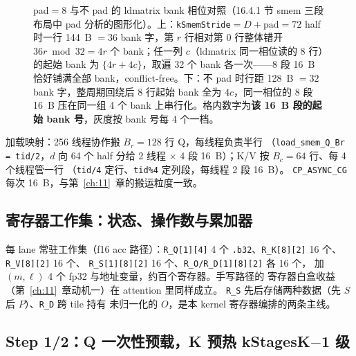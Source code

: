 \begin{figure}[H]
\caption{pad$=$8 与不 pad 的 ldmatrix bank 相位对照（16.4.1 节 smem 三段布局中 pad 分析的图形化）。上：\texttt{kSmemStride}$=D{+}\mathrm{pad}=72$ half 时一行 144~B $=36$ bank 字，第 $r$ 行相对第 0 行整体错开 $36r \bmod 32 = 4r$ 个 bank；任一列 $c$（ldmatrix 同一相位读的 8 行）的起始 bank 为 $\{4r{+}4c\}$，取遍 32 个 bank 各一次——8 段 16~B 恰好铺满全部 bank，conflict-free。下：不 pad 时行距 128~B $=32$ bank 字，整周期回绕后 8 行起始 bank 全为 $4c$，同一相位的 8 段 16~B 压在同一组 4 个 bank 上串行化。格内数字为\textbf{该 16~B 段的起始 bank 号}，灰度按 bank 号每 4 个一档。}
\label{fig:16-bank-phase}
\end{figure}

加载映射：256 线程协作搬 $B_r{=}128$ 行 Q，每线程负责半行
（\texttt{load\_\allowbreak{}smem\_\allowbreak{}Q\_\allowbreak{}Br =\allowbreak{} tid/\allowbreak{}2}，$d$ 向 64 个 half 分给 2 线程
$\times$ 4 段 16~B）；K/V 按 $B_c{=}64$ 行、每 4 个线程管一行
（\texttt{tid/4} 定行、\texttt{tid\%4} 定列段，每线程 2 段 16~B）。
\texttt{CP\_ASYNC\_CG} 每次 16~B，与第~\ref{ch:11}~章的搬运粒度一致。

\subsection{寄存器工作集：状态、操作数与累加器}



每 lane 常驻工作集（f16 acc 路径）：\texttt{R\_Q[1][4]} 4 个
\texttt{.b32}、\texttt{R\_K[8][2]} 16 个、\texttt{R\_V[8][2]} 16 个、
\texttt{R\_\allowbreak{}S[1][8][2]} 16 个、\texttt{R\_\allowbreak{}O/\allowbreak{}R\_\allowbreak{}D[1][8][2]} 各 16 个，
加 $(m,\ell)$ 4 个 fp32 与地址变量，约百个寄存器。手写路径的
寄存器白盒收益（第~\ref{ch:11}~章动机一）在 attention 里同样成立。
\texttt{R\_S} 先后存储两种数据（先 $S$ 后 $P$）、\texttt{R\_D} 跨 tile 持有
未归一化的 $O$，是本 kernel 寄存器编排的两条主线。

\subsection{Step 1/2：Q 一次性预载，K 预热 kStagesK$-$1 级}

